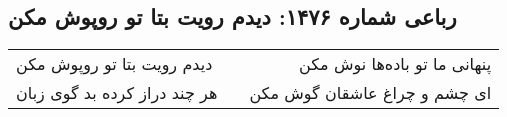 \begin{center}
\section*{رباعی شماره ۱۴۷۶: دیدم رویت بتا تو روپوش مکن}
\label{sec:1476}
\begin{longtable}{l p{0.5cm} r}
دیدم رویت بتا تو روپوش مکن
&&
پنهانی ما تو باده‌ها نوش مکن
\\
هر چند دراز کرده بد گوی زبان
&&
ای چشم و چراغ عاشقان گوش مکن
\\
\end{longtable}
\end{center}
